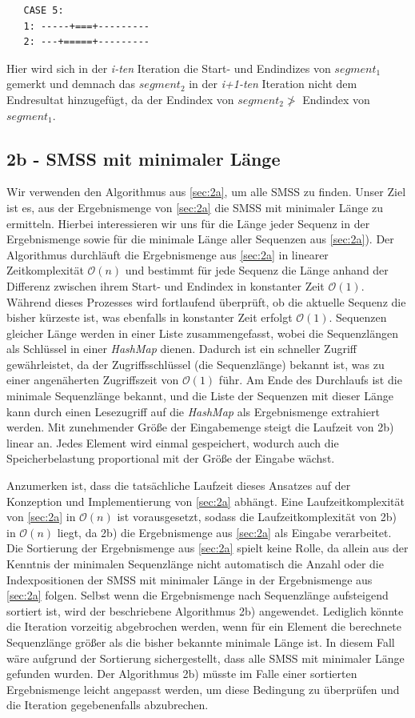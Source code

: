 \documentclass[10pt]{article}
\begin{document}
\begin{verbatim} 
   CASE 5:
   1: -----+===+---------
   2: ---+=====+---------
\end{verbatim}
Hier wird sich in der \textit{i-ten} Iteration die Start- und Endindizes von $segment_{1}$ gemerkt
und demnach das $segment_{2}$ in der \textit{i+1-ten} Iteration nicht dem Endresultat hinzugefügt,
da der Endindex von $segment_2 \not >$  Endindex von $segment_1$.

\subsection{2b - SMSS mit minimaler Länge}\label{sec:2b}
Wir verwenden den Algorithmus aus \ref{sec:2a}, um alle SMSS zu finden. 
Unser Ziel ist es, aus der Ergebnismenge von \ref{sec:2a} die SMSS mit minimaler Länge zu ermitteln. 
Hierbei interessieren wir uns für die Länge jeder Sequenz in der Ergebnismenge sowie für 
die minimale Länge aller Sequenzen aus \ref{sec:2a}).
Der Algorithmus durchläuft die Ergebnismenge aus \ref{sec:2a} in linearer Zeitkomplexität $\mathcal{O}(n)$ 
und bestimmt für jede Sequenz die Länge anhand der Differenz zwischen ihrem Start- und Endindex in 
konstanter Zeit $\mathcal{O}(1)$. Während dieses Prozesses wird fortlaufend überprüft, 
ob die aktuelle Sequenz die bisher kürzeste ist, was ebenfalls in konstanter Zeit erfolgt $\mathcal{O}(1)$. 
Sequenzen gleicher Länge werden in einer Liste zusammengefasst, wobei die Sequenzlängen als Schlüssel 
in einer \textit{HashMap} dienen. Dadurch ist ein schneller Zugriff gewährleistet, 
da der Zugriffsschlüssel (die Sequenzlänge) bekannt ist, was zu einer angenäherten Zugriffszeit von 
$\mathcal{O}(1)$ führ.
Am Ende des Durchlaufs ist die minimale Sequenzlänge bekannt, und die Liste der Sequenzen mit dieser 
Länge kann durch einen Lesezugriff auf die \textit{HashMap} als Ergebnismenge extrahiert werden.
Mit zunehmender Größe der Eingabemenge steigt die Laufzeit von 2b) linear an. 
Jedes Element wird einmal gespeichert, wodurch auch die Speicherbelastung proportional mit der 
Größe der Eingabe wächst.

Anzumerken ist, dass die tatsächliche Laufzeit dieses Ansatzes auf der Konzeption und Implementierung 
von \ref{sec:2a} abhängt. 
Eine Laufzeitkomplexität von \ref{sec:2a} in $\mathcal{O}(n)$ ist vorausgesetzt, sodass die 
Laufzeitkomplexität von 2b) in $\mathcal{O}(n)$ liegt, da 2b) die Ergebnismenge 
aus \ref{sec:2a} als Eingabe verarbeitet.
Die Sortierung der Ergebnismenge aus \ref{sec:2a} spielt keine Rolle, da allein aus der Kenntnis der minimalen 
Sequenzlänge nicht automatisch die Anzahl oder die Indexpositionen der SMSS mit minimaler Länge in 
der Ergebnismenge aus \ref{sec:2a} folgen. 
Selbst wenn die Ergebnismenge nach Sequenzlänge aufsteigend sortiert ist, wird der beschriebene 
Algorithmus 2b) angewendet. Lediglich könnte die Iteration vorzeitig abgebrochen werden, 
wenn für ein Element die berechnete Sequenzlänge größer als die bisher bekannte minimale Länge ist. 
In diesem Fall wäre aufgrund der Sortierung sichergestellt, dass alle SMSS mit minimaler 
Länge gefunden wurden. Der Algorithmus 2b) müsste im Falle einer sortierten Ergebnismenge leicht 
angepasst werden, um diese Bedingung zu überprüfen und die Iteration gegebenenfalls abzubrechen.
\end{document}
